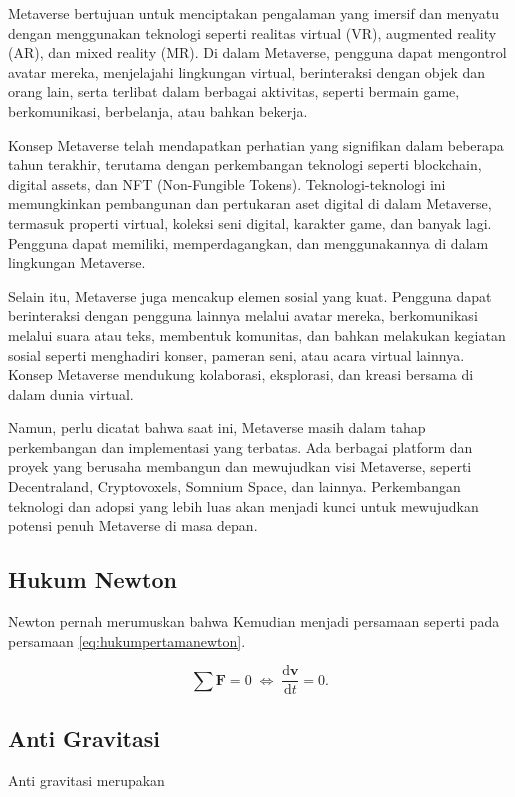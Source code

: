 Metaverse bertujuan untuk menciptakan pengalaman yang imersif dan menyatu dengan menggunakan teknologi seperti realitas virtual (VR), augmented reality (AR), dan mixed reality (MR). Di dalam Metaverse, pengguna dapat mengontrol
avatar mereka, menjelajahi lingkungan virtual, berinteraksi dengan objek dan orang lain, serta terlibat dalam berbagai aktivitas, seperti bermain game, berkomunikasi, berbelanja, atau bahkan bekerja. \parencite{kietzmann2011social}

Konsep Metaverse telah mendapatkan perhatian yang signifikan dalam beberapa tahun terakhir, terutama dengan perkembangan teknologi seperti blockchain, digital assets,
dan NFT (Non-Fungible Tokens). Teknologi-teknologi ini memungkinkan pembangunan dan pertukaran aset digital di dalam Metaverse, termasuk properti virtual, koleksi seni digital, karakter game, dan banyak lagi.
Pengguna dapat memiliki, memperdagangkan, dan menggunakannya di dalam lingkungan Metaverse.

Selain itu, Metaverse juga mencakup elemen sosial yang kuat. Pengguna dapat berinteraksi dengan pengguna lainnya melalui avatar mereka, berkomunikasi melalui suara atau teks, membentuk komunitas,
dan bahkan melakukan kegiatan sosial seperti menghadiri konser, pameran seni, atau acara virtual lainnya. Konsep Metaverse mendukung kolaborasi, eksplorasi, dan kreasi bersama di dalam dunia virtual.

Namun, perlu dicatat bahwa saat ini, Metaverse masih dalam tahap perkembangan dan implementasi yang terbatas. Ada berbagai platform dan proyek yang berusaha membangun dan mewujudkan visi Metaverse,
seperti Decentraland, Cryptovoxels, Somnium Space, dan lainnya. Perkembangan teknologi dan adopsi yang lebih luas akan menjadi kunci untuk mewujudkan potensi penuh Metaverse di masa depan. \parencite{castronova2005synthetic}

\subsection{Hukum Newton}
\label{subsec:hukumnewton}

Newton \parencite{newton1687} pernah merumuskan bahwa \lipsum[1]
Kemudian menjadi persamaan seperti pada persamaan \ref{eq:hukumpertamanewton}.

\begin{equation}
  \label{eq:hukumpertamanewton}
  \sum \mathbf{F} = 0\; \Leftrightarrow\; \frac{\mathrm{d} \mathbf{v} }{\mathrm{d}t} = 0.
\end{equation}

\subsection{Anti Gravitasi}
\label{subsec:antigravitasi}

Anti gravitasi merupakan \lipsum[1]
